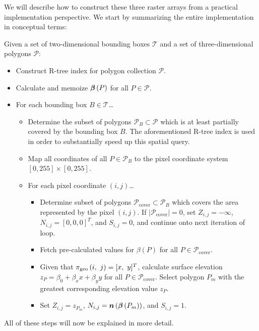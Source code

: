 We will describe how to construct these three raster arrays from a practical implementation perspective.
We start by summarizing the entire implementation in conceptual terms:
\begin{leftbar}
  \noindent
  Given a set of two-dimensional bounding boxes $\mathcal{T}$ and a set of three-dimensional polygons $\mathcal{P}$:
  \begin{itemize}[nosep,leftmargin=*]
    \item Construct R-tree index for polygon collection $\mathcal{P}$.
    \item Calculate and memoize $\boldsymbol{\beta}\left(P\right)$ for all $P \in \mathcal{P}$.
    \item For each bounding box $B \in \mathcal{T}$\ldots
    \begin{itemize}[nosep,leftmargin=0.5cm]
      \item Determine the subset of polygons $\mathcal{P}_B \subset \mathcal{P}$ which is at least partially covered by the bounding box $B$.
        The aforementioned R-tree index is used in order to substantially speed up this spatial query.
      \item Map all coordinates of all $P \in \mathcal{P}_B$ to the pixel coordinate system $\left[0, 255\right] \times \left[0, 255\right]$.
      \item For each pixel coordinate $(i, j)$\ldots
      \begin{itemize}[nosep,leftmargin=0.5cm]
        \item Determine subset of polygons $\mathcal{P}_{\mathrm{cover}} \subset \mathcal{P}_B$ which covers the area represented by the pixel $(i, j)$.
          If $|\mathcal{P}_{\mathrm{cover}}| = 0$, set $Z_{i,j} = -\infty$, $N_{i, j} = {[0, 0, 0]}^T$, and $S_{i, j} = 0$, and continue onto next iteration of loop.
        \item Fetch pre-calculated values for $\beta(P)$ for all $P \in \mathcal{P}_{\mathrm{cover}}$.
        \item Given that $\pi_{\mathrm{geo}}\left(i,~j\right) = [x,~y]^T$, calculate surface elevation $z_P = \beta_0 + \beta_x x + \beta_y y$ for all $P \in \mathcal{P}_{\mathrm{cover}}$.
          Select polygon $P_m$ with the greatest corresponding elevation value $z_P$.
        \item Set $Z_{i,j} = z_{P_m}$, $N_{i, j} = \boldsymbol{n}\left(\boldsymbol{\beta}\left(P_m\right)\right)$, and $S_{i, j} = 1$.
      \end{itemize}
    \end{itemize}
  \end{itemize}
\end{leftbar}
\noindent
All of these steps will now be explained in more detail.

